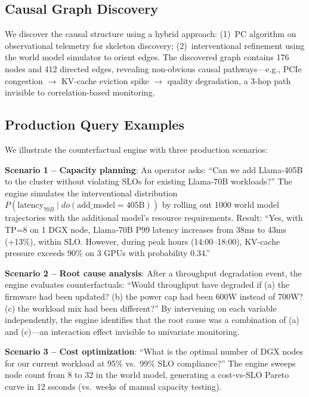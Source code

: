 \documentclass[conference,10pt]{IEEEtran}
\begin{document}
\subsection{Causal Graph Discovery}

We discover the causal structure using a hybrid approach: (1)~PC algorithm on observational telemetry for skeleton discovery; (2)~interventional refinement using the world model simulator to orient edges. The discovered graph contains 176 nodes and 412 directed edges, revealing non-obvious causal pathways---e.g., PCIe congestion $\to$ KV-cache eviction spike $\to$ quality degradation, a 3-hop path invisible to correlation-based monitoring.


\subsection{Production Query Examples}

We illustrate the counterfactual engine with three production scenarios:

\textbf{Scenario 1 -- Capacity planning}: An operator asks: ``Can we add Llama-405B to the cluster without violating SLOs for existing Llama-70B workloads?'' The engine simulates the interventional distribution $P(\text{latency}_{70B} \mid do(\text{add\_model} = \text{405B}))$ by rolling out 1000 world model trajectories with the additional model's resource requirements. Result: ``Yes, with TP=8 on 1 DGX node, Llama-70B P99 latency increases from 38ms to 43ms (+13\%), within SLO. However, during peak hours (14:00--18:00), KV-cache pressure exceeds 90\% on 3 GPUs with probability 0.34.''

\textbf{Scenario 2 -- Root cause analysis}: After a throughput degradation event, the engine evaluates counterfactuals: ``Would throughput have degraded if (a) the firmware had been updated? (b) the power cap had been 600W instead of 700W? (c) the workload mix had been different?'' By intervening on each variable independently, the engine identifies that the root cause was a combination of (a) and (c)---an interaction effect invisible to univariate monitoring.

\textbf{Scenario 3 -- Cost optimization}: ``What is the optimal number of DGX nodes for our current workload at 95\% vs.\ 99\% SLO compliance?'' The engine sweeps node count from 8 to 32 in the world model, generating a cost-vs-SLO Pareto curve in 12 seconds (vs.\ weeks of manual capacity testing).

\end{document}

